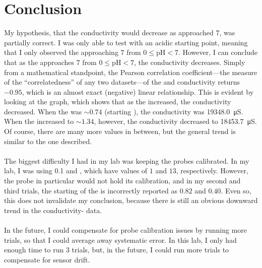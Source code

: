 \documentclass[a4paper]{article}
\newcommand{\pH}{\text{pH}}
\begin{document}
    \section{Conclusion}
        My hypothesis, that the conductivity would decrease as \pH{} approached $7$, was
        partially correct. I was only able to test with an acidic starting point, meaning
        that I only observed the \pH{} approaching $7$ from $0\le{\pH}<{7}$. However, I can
        conclude that as the \pH{} approaches $7$ from $0\le{\pH}<{7}$, the conductivity decreases.
        Simply from a mathematical standpoint, the Pearson correlation coefficient---the measure of the
        ``correlatedness'' of any two datasets---of the \pH and conductivity returns
        $-0.95$, which is an almost exact (negative) linear relationship. This is evident
        by looking at the graph, which shows that as the \pH{} increased, the conductivity
        decreased. When the \pH{} was $\sim0.74$ (starting \pH), the conductivity was
        \SI{19348.0}{\micro\siemens}. When the \pH{} increased to $\sim1.34$, however,
        the conductivity decreased to \SI{18453.7}{\micro\siemens}. Of course, there are
        many more values in between, but the general trend is similar to the one described.
        \\\\
        The biggest difficulty I had in my lab was keeping the probes calibrated.
        In my lab, I was using \SI{0.1}{\Molar}  and , which have \pH{}
        values of $1$ and $13$, respectively. However, the \pH{} probe in particular
        would not hold its calibration, and in my second and third trials, the starting \pH{}
        of the  is incorrectly reported as $0.82$ and $0.40$. Even so, this does not
        invalidate my conclusion, because there is still an obvious downward trend in the
        conductivity-\pH{} data.
        \\\\
        In the future, I could compensate for probe calibration issues by running more
        trials, so that I could average away systematic error. In this lab, I only had
        enough time to run 3 trials, but, in the future, I could run more trials
        to compensate for sensor drift.
\end{document}
